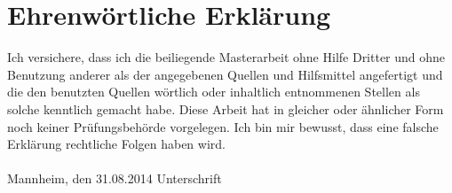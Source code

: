 \documentclass[11pt,titlepage,oneside,openany]{book}
\begin{document}
\newpage


\pagestyle{empty}


\section*{Ehrenw\"ortliche Erkl\"arung}
Ich versichere, dass ich die beiliegende Masterarbeit ohne Hilfe Dritter und ohne Benutzung anderer als der angegebenen Quellen und Hilfsmittel angefertigt und die den benutzten Quellen w\"ortlich oder inhaltlich entnommenen Stellen als solche kenntlich gemacht habe. Diese Arbeit
hat in gleicher oder \"ahnlicher Form noch keiner Pr\"ufungsbeh\"orde vorgelegen. Ich bin mir bewusst, dass eine falsche Erkl\"arung rechtliche Folgen haben wird.
\\
\\

\noindent
Mannheim, den 31.08.2014 \hspace{4cm} Unterschrift
\end{document}
